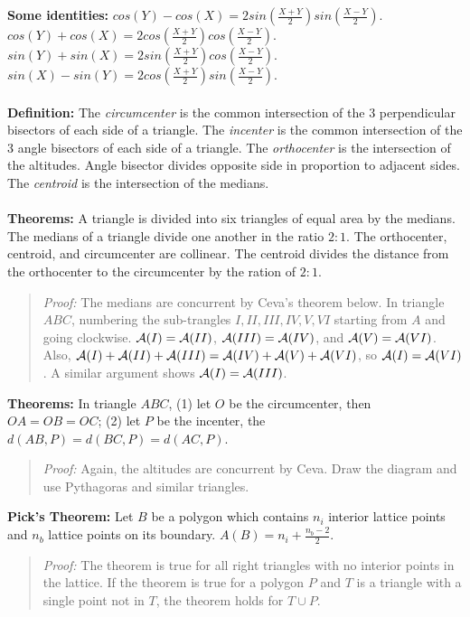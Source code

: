 {\bf Some identities:} 
$cos(Y) - cos(X) = 2 sin({\frac {X+Y} {2}}) sin({\frac {X-Y} {2}})$.
$cos(Y) + cos(X) = 2 cos({\frac {X+Y} {2}}) cos({\frac {X-Y} {2}})$.
$sin(Y) + sin(X) = 2 sin({\frac {X+Y} {2}}) cos({\frac {X-Y} {2}})$.
$sin(X) - sin(Y) = 2 cos({\frac {X+Y} {2}}) sin({\frac {X-Y} {2}})$.
\\
\\
{\bf Definition:}
The \emph{circumcenter} is the common intersection of the 3 perpendicular bisectors of
each side of a triangle.
The \emph{incenter} is the common intersection of the 3 angle bisectors of each side
of a triangle.
The \emph{orthocenter} is the intersection of the altitudes.
Angle bisector divides opposite side in proportion to adjacent sides.
The \emph{centroid} is the intersection of the medians.
\\
\\
{\bf Theorems:}  A triangle is divided into six triangles of equal area by the
medians.  The medians of a triangle divide one another in the ratio $2:1$.
The orthocenter, centroid, and circumcenter are collinear.  The centroid divides
the distance from the orthocenter to the circumcenter by the ration of $2:1$.
\begin{quote}
\emph{Proof:}
The medians are concurrent by Ceva's theorem below.  In triangle $ABC$, numbering the sub-trangles
$I, II, III, IV, V, VI$ starting from $A$ and going clockwise. ${\cal A}(I) = {\cal A}(II)$,
${\cal A}(III) = {\cal A}(IV)$, and ${\cal A}(V) = {\cal A}(VI)$.  Also,
${\cal A}(I) + {\cal A}(II) + {\cal A}(III)= {\cal A}(IV) +  {\cal A}(V) + {\cal A}(VI)$, so
${\cal A}(I) = {\cal A}(VI)$.  A similar argument shows ${\cal A}(I) = {\cal A}(III)$.
\end{quote}
{\bf Theorems:}  In triangle $ABC$, (1) let $O$ be the circumcenter, then $OA = OB = OC$;
(2) let $P$ be the incenter, the $d(AB, P) = d(BC, P) = d(AC, P)$.
\begin{quote}
\emph{Proof:}
Again, the altitudes are concurrent by Ceva.  Draw the diagram and use Pythagoras and similar triangles.
\end{quote}
{\bf Pick's Theorem:}  Let $B$ be a polygon which contains
$n_i$ interior lattice points and
$n_b$ lattice points on its boundary. $A(B)= n_i+{\frac {n_b-2} 2}$.
\begin{quote}
\emph{Proof:}
The theorem is true for all right triangles with no interior points in the lattice. 
If the theorem is true for a polygon $P$ and $T$ is a triangle with a single point not in $T$,
the theorem holds for $T \cup P$.
\end{quote}
